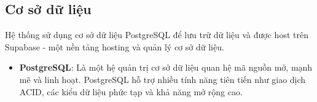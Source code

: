 \subsection{Cơ sở dữ liệu}

Hệ thống sử dụng cơ sở dữ liệu PostgreSQL để lưu trữ dữ liệu và được host trên Supabase\cite{supabasedoc} - một nền tảng hosting và quản lý cơ sở dữ liệu.
\begin{itemize}
    \item \textbf{PostgreSQL}\cite{postgresqldoc}: Là một hệ quản trị cơ sở dữ liệu quan hệ mã nguồn mở, mạnh mẽ và linh hoạt. PostgreSQL hỗ trợ nhiều tính năng tiên tiến như giao dịch ACID, các kiểu dữ liệu phức tạp và khả năng mở rộng cao.
\end{itemize}